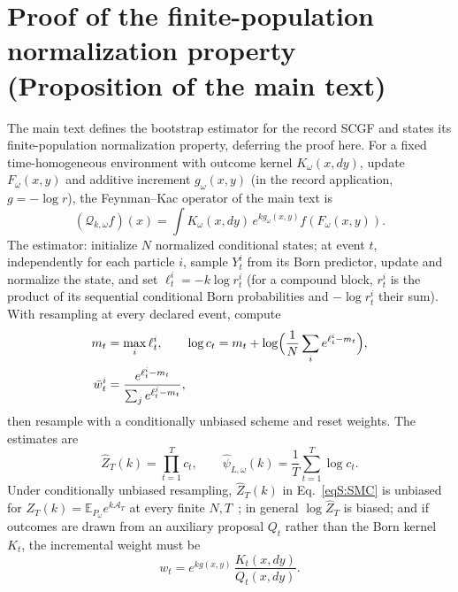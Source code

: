 \documentclass[aps,prx,reprint,superscriptaddress,nobibnotes,longbibliography]{revtex4-2}
\newcommand{\E}{\mathbb E}
\begin{document}
\section{Proof of the finite-population normalization property
(Proposition of the main text)}
\label{sm:smcproof}

The main text defines the bootstrap estimator for the record SCGF and
states its finite-population normalization property, deferring the proof
here.  For a fixed time-homogeneous environment with outcome kernel
$K_\omega(x,dy)$, update $F_\omega(x,y)$ and additive increment
$g_\omega(x,y)$ (in the record application, $g=-\log r$), the
Feynman--Kac operator of the main text is
\begin{equation}
 (\mathcal Q_{k,\omega}f)(x)=\int K_\omega(x,dy)\,
 e^{kg_\omega(x,y)}f(F_\omega(x,y)).
 \label{eqS:FK}
\end{equation}
The estimator: initialize $N$ normalized conditional states; at event
$t$, independently for each particle $i$, sample $Y_t^i$ from its Born
predictor, update and normalize the state, and set
$\ell_t^i=-k\log r_t^i$ (for a compound block, $r_t^i$ is the product of
its sequential conditional Born probabilities and $-\log r_t^i$ their
sum).  With resampling at every declared event, compute
\begin{align}
 m_t&=\max_i\ell_t^i,\qquad
 \log c_t=m_t+\log\Bigl(\frac1N\sum_i e^{\ell_t^i-m_t}\Bigr),\nonumber\\
 \bar w_t^i&=\frac{e^{\ell_t^i-m_t}}{\sum_j e^{\ell_t^j-m_t}},\nonumber
\end{align}
then resample with a conditionally unbiased scheme and reset weights.
The estimates are
\begin{equation}
 \widehat Z_T(k)=\prod_{t=1}^Tc_t,\qquad
 \widehat\psi_{L,\omega}(k)=\frac1T\sum_{t=1}^T\log c_t.
 \label{eqS:SMC}
\end{equation}
Under conditionally unbiased resampling, $\widehat Z_T(k)$ in
Eq.~\eqref{eqS:SMC} is unbiased for $Z_T(k)=\E_{P_\omega}e^{k\mathcal A_T}$
at every finite $N,T$~\cite{DelMoral2004}; in general
$\log\widehat Z_T$ is biased; and if outcomes are drawn from an auxiliary
proposal $Q_t$ rather than the Born kernel $K_t$, the incremental weight
must be
\begin{equation}
 w_t=e^{kg(x,y)}\,\frac{K_t(x,dy)}{Q_t(x,dy)}.
 \label{eqS:RN}
\end{equation}
\end{document}

